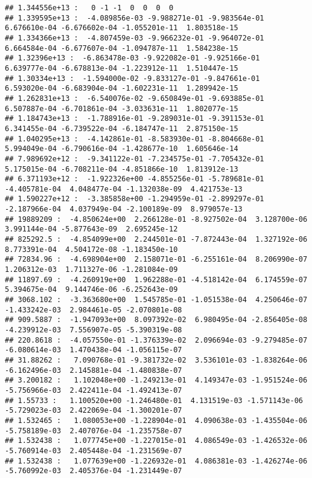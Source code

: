 \documentclass[]{book}
\theoremstyle{definition}
\theoremstyle{definition}
\theoremstyle{definition}
\theoremstyle{remark}
\begin{document}
\begin{verbatim}
## 1.344556e+13 :   0 -1 -1  0  0  0  0
## 1.339595e+13 :  -4.089856e-03 -9.988271e-01 -9.983564e-01  6.676610e-04 -6.676602e-04 -1.055201e-11  1.803518e-15
## 1.334366e+13 :  -4.807459e-03 -9.966232e-01 -9.964072e-01  6.664584e-04 -6.677607e-04 -1.094787e-11  1.584238e-15
## 1.32396e+13 :  -6.863478e-03 -9.922082e-01 -9.925166e-01  6.639777e-04 -6.678813e-04 -1.223912e-11  1.510447e-15
## 1.30334e+13 :  -1.594000e-02 -9.833127e-01 -9.847661e-01  6.593020e-04 -6.683904e-04 -1.602231e-11  1.289942e-15
## 1.262831e+13 :  -6.540076e-02 -9.650849e-01 -9.693885e-01  6.507887e-04 -6.701861e-04 -3.033631e-11  1.802077e-15
## 1.184743e+13 :  -1.788916e-01 -9.289031e-01 -9.391153e-01  6.341455e-04 -6.739522e-04 -6.184747e-11  2.875150e-15
## 1.040295e+13 :  -4.142861e-01 -8.583930e-01 -8.804668e-01  5.994049e-04 -6.790616e-04 -1.428677e-10  1.605646e-14
## 7.989692e+12 :  -9.341122e-01 -7.234575e-01 -7.705432e-01  5.175015e-04 -6.708211e-04 -4.851866e-10  1.813912e-13
## 6.371193e+12 :  -1.922326e+00 -4.855256e-01 -5.789681e-01 -4.405781e-04  4.048477e-04 -1.132038e-09  4.421753e-13
## 1.590227e+12 :  -3.385858e+00 -1.294959e-01 -2.899297e-01 -2.187966e-04  4.037949e-04 -2.100189e-09  8.979057e-13
## 19889209 :  -4.850624e+00  2.266128e-01 -8.927502e-04  3.128700e-06  3.991144e-04 -5.877643e-09  2.695245e-12
## 825292.5 :  -4.854099e+00  2.244501e-01 -7.872443e-04  1.327192e-06  8.773391e-04  4.504172e-08 -1.183450e-10
## 72834.96 :  -4.698904e+00  2.158071e-01 -6.255161e-04  8.206990e-07  1.206312e-03  1.711327e-06 -1.281084e-09
## 11897.69 :  -4.260919e+00  1.962288e-01 -4.518142e-04  6.174559e-07  5.394675e-04  9.144746e-06 -6.252643e-09
## 3068.102 :  -3.363680e+00  1.545785e-01 -1.051538e-04  4.250646e-07 -1.433242e-03  2.984461e-05 -2.070801e-08
## 909.5887 :  -1.947093e+00  8.097392e-02  6.980495e-04 -2.856405e-08 -4.239912e-03  7.556907e-05 -5.390319e-08
## 220.8618 :  -4.057550e-01 -1.376339e-02  2.096694e-03 -9.279485e-07 -6.080614e-03  1.470438e-04 -1.056115e-07
## 31.88262 :   7.090768e-01 -9.381732e-02  3.536101e-03 -1.838264e-06 -6.162496e-03  2.145881e-04 -1.480838e-07
## 3.200182 :   1.102048e+00 -1.249213e-01  4.149347e-03 -1.951524e-06 -5.756966e-03  2.422411e-04 -1.492413e-07
## 1.55733 :   1.100520e+00 -1.246480e-01  4.131519e-03 -1.571143e-06 -5.729023e-03  2.422069e-04 -1.300201e-07
## 1.532465 :   1.080053e+00 -1.228904e-01  4.090638e-03 -1.435504e-06 -5.758189e-03  2.407076e-04 -1.235758e-07
## 1.532438 :   1.077745e+00 -1.227015e-01  4.086549e-03 -1.426532e-06 -5.760914e-03  2.405448e-04 -1.231569e-07
## 1.532438 :   1.077639e+00 -1.226932e-01  4.086381e-03 -1.426274e-06 -5.760992e-03  2.405376e-04 -1.231449e-07
\end{verbatim}
\end{document}
